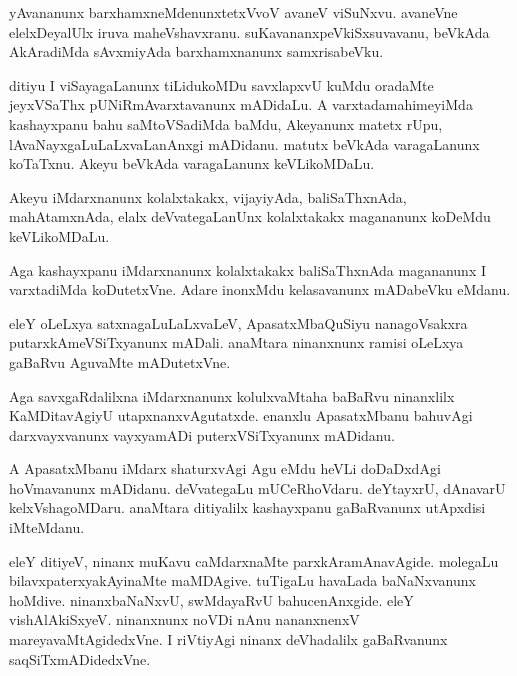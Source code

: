 \documentclass{article}
\begin{document}
\begin{mn}%
yAvananunx barxhamxneMdenunxtetxVvoV avaneV viSuNxvu. avaneVne
elelxDeyalUlx iruva maheVshavxranu. suKavananxpeVkiSxsuvavanu, beVkAda
AkAradiMda sAvxmiyAda barxhamxnanunx samxrisabeVku.
\end{mn}

\begin{mn}%
ditiyu I viSayagaLanunx tiLidukoMDu savxlapxvU kuMdu oradaMte
jeyxVSaThx pUNiRmAvarxtavanunx mADidaLu. A varxtadamahimeyiMda
kashayxpanu bahu saMtoVSadiMda baMdu, Akeyanunx matetx rUpu,
lAvaNayxgaLuLaLxvaLanAnxgi mADidanu. matutx beVkAda varagaLanunx
koTaTxnu. Akeyu beVkAda varagaLanunx keVLikoMDaLu.
\end{mn}

\begin{mn}%
Akeyu iMdarxnanunx kolalxtakakx, vijayiyAda, baliSaThxnAda,
mahAtamxnAda, elalx deVvategaLanUnx kolalxtakakx magananunx koDeMdu keVLikoMDaLu.
\end{mn}

\begin{mn}
Aga kashayxpanu iMdarxnanunx kolalxtakakx baliSaThxnAda magananunx I
varxtadiMda koDutetxVne. Adare inonxMdu kelasavanunx mADabeVku eMdanu.
\end{mn}

\begin{mn}%
eleY oLeLxya satxnagaLuLaLxvaLeV, ApasatxMbaQuSiyu nanagoVsakxra
putarxkAmeVSiTxyanunx mADali. anaMtara ninanxnunx ramisi oLeLxya
gaBaRvu AguvaMte mADutetxVne.
\end{mn}

\begin{mn}
Aga savxgaRdalilxna iMdarxnanunx kolulxvaMtaha baBaRvu ninanxlilx
KaMDitavAgiyU utapxnanxvAgutatxde. enanxlu ApasatxMbanu bahuvAgi
darxvayxvanunx vayxyamADi puterxVSiTxyanunx mADidanu.
\end{mn}

\begin{mn}
A ApasatxMbanu iMdarx shaturxvAgi Agu eMdu heVLi doDaDxdAgi
hoVmavanunx mADidanu. deVvategaLu mUCeRhoVdaru. deYtayxrU, dAnavarU
kelxVshagoMDaru. anaMtara ditiyalilx kashayxpanu gaBaRvanunx utApxdisi iMteMdanu.
\end{mn}

\begin{mn}%
eleY ditiyeV, ninanx muKavu caMdarxnaMte parxkAramAnavAgide. molegaLu
bilavxpaterxyakAyinaMte maMDAgive. tuTigaLu havaLada baNaNxvanunx
hoMdive. ninanxbaNaNxvU, swMdayaRvU bahucenAnxgide. eleY
vishAlAkiSxyeV. ninanxnunx noVDi nAnu nananxnenxV
mareyavaMtAgidedxVne. I riVtiyAgi ninanx deVhadalilx gaBaRvanunx saqSiTxmADidedxVne.
\end{mn}
\end{document}

